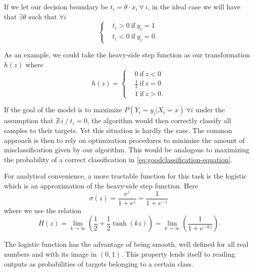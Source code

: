 If we let our decision boundary be $ t_i = \theta \cdot x_i \ \forall \ i $, in the ideal case we will have that $\exists \theta \mbox{ such that } \forall i $
\begin{equation}
\begin{cases}
& t_i >0 \ \mbox{if} \ y_i=1 \\
& t_i <0 \ \mbox{if} \ y_i=0.
\end{cases}
\end{equation}

As an example, we could take the heavy-side step function as our transformation $h(z)$ where
\begin{equation}
h(z) =
\begin{cases}
&0 \ \mbox{if} \ z<0 \\
&\frac{1}{2} \ \mbox{if} \ z=0 \\
&1 \ \mbox{if} \ z>0.
\end{cases}
\end{equation}

If the goal of the model is to maximize $P(Y_i = y_i | X_i = x) \ \forall i$
under the assumption that $\nexists\ i \ / \ t_i = 0$, the algorithm would then correctly classify all samples to their targets. Yet this situation is hardly the case. The common approach is then to rely on optimization procedures to minimize the amount of misclassification given by our algorithm. This would be analogous to maximizing the probability of a correct classification in \cref{eq:goodclassification-equation}.

For analytical convenience, a more tractable function for this task is the logistic which is an approximation of the heavy-side step function. Here
\begin{equation}\label{eq:logisticFunction}
\sigma(z) = \frac{e^{z}}{1 + e^{z}} = \frac{1}{1 + e^{-z}}
\end{equation}
where we use the relation
\begin{equation}
 \ H(z) = \lim_{k \to \infty} \left(\frac{1}{2} + \frac{1}{2}\tanh(kz) \right) = \lim_{k \to \infty} \left(\frac{1}{1+e^{-kz}} \right) .
\end{equation}

The logistic function has the advantage of being smooth, well defined for all real numbers and with its image in $(0,1)$. This property lends itself to reading outputs as probabilities of targets belonging to a certain class.

